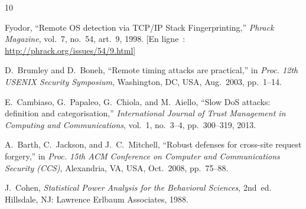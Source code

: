 \documentclass[10pt,conference,compsoc]{IEEEtran}
\begin{document}
\begin{thebibliography}{10}

Fyodor,
``Remote OS detection via TCP/IP Stack Fingerprinting,''
\emph{Phrack Magazine}, vol.~7, no.~54, art.~9, 1998.
[En ligne~: \url{http://phrack.org/issues/54/9.html}]

D.~Brumley and D.~Boneh,
``Remote timing attacks are practical,''
in \emph{Proc. 12th USENIX Security Symposium},
Washington, DC, USA, Aug.~2003, pp.~1--14.

E.~Cambiaso, G.~Papaleo, G.~Chiola, and M.~Aiello,
``Slow DoS attacks: definition and categorisation,''
\emph{International Journal of Trust Management in Computing
and Communications}, vol.~1, no.~3--4, pp.~300--319, 2013.

A.~Barth, C.~Jackson, and J.~C.~Mitchell,
``Robust defenses for cross-site request forgery,''
in \emph{Proc. 15th ACM Conference on Computer and Communications
Security (CCS)}, Alexandria, VA, USA, Oct.~2008, pp.~75--88.

J.~Cohen,
\emph{Statistical Power Analysis for the Behavioral Sciences},
2nd~ed. Hillsdale, NJ: Lawrence Erlbaum Associates, 1988.

\end{thebibliography}
\end{document}
